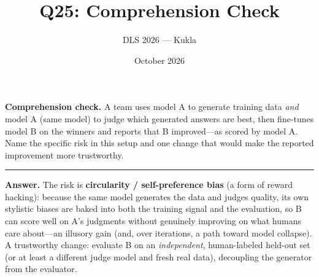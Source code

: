 \documentclass[11pt]{article}
\title{Q25: Comprehension Check}
\author{DLS 2026 --- Kukla}
\date{October 2026}
\begin{document}
\maketitle
\textbf{Comprehension check.} A team uses model A to generate training data \emph{and} model A (same model)
to judge which generated answers are best, then fine-tunes model B on the winners and reports that B
improved---as scored by model A. Name the specific risk in this setup and one change that would make the
reported improvement more trustworthy.

\vspace{0.8cm}\hrule\vspace{4pt}
{\small\textbf{Answer.} The risk is \textbf{circularity / self-preference bias} (a form of reward hacking):
because the same model generates the data and judges quality, its own stylistic biases are baked into both
the training signal and the evaluation, so B can score well on A's judgments without genuinely improving on
what humans care about---an illusory gain (and, over iterations, a path toward model collapse). A
trustworthy change: evaluate B on an \emph{independent}, human-labeled held-out set (or at least a different
judge model and fresh real data), decoupling the generator from the evaluator.}
\end{document}
